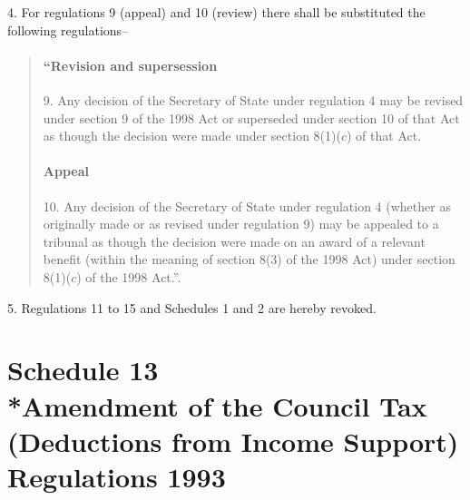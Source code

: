 \documentclass[12pt,a4paper]{article}
\begin{document}
4.  For regulations 9 (appeal) and 10 (review) there shall be substituted the following regulations–
\begin{quotation}
\subsection*{“Revision and supersession}

9.  Any decision of the Secretary of State under regulation 4 may be revised under section 9 of the 1998 Act or superseded under section 10 of that Act as though the decision were made under section 8(1)($c$)  of that Act.

\subsection*{Appeal}

10.  Any decision of the Secretary of State under regulation 4 (whether as originally made or as revised under regulation 9) may be appealed to a tribunal as though the decision were made on an award of a relevant benefit (within the meaning of section 8(3) of the 1998 Act) under section 8(1)($c$)  of the 1998 Act.”.
\end{quotation}

\medskip

5.  Regulations 11 to 15 and Schedules 1 and 2 are hereby revoked.

\part[Schedule 13 --- Amendment of the Council Tax (Deductions from Income Support) Regulations 1993]{Schedule 13\\*Amendment of the Council Tax (Deductions from Income Support) Regulations 1993}

\renewcommand\parthead{--- Schedule 13}
\end{document}
